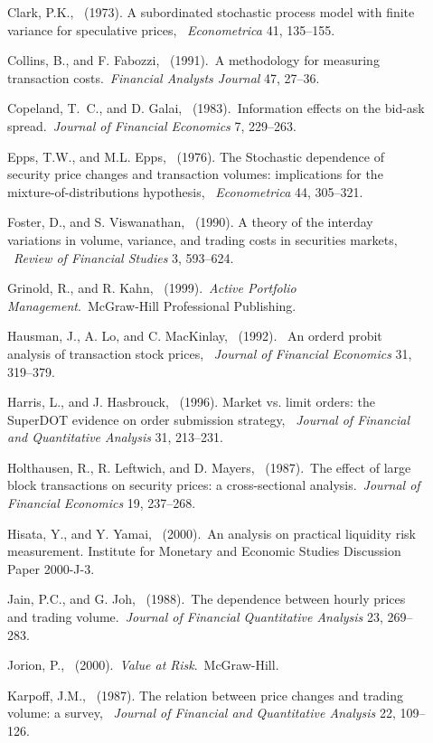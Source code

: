 \begin{description}
 \item[] Clark, P.K., ~(1973). A subordinated stochastic process model with finite variance for speculative prices, ~{\it Econometrica} 41, 135--155.
 \item[] Collins, B., and F. Fabozzi, ~(1991).~A methodology for measuring transaction costs.~{\it Financial Analysts Journal} 47, 27--36.
 \item[] Copeland, T.~C., and D. Galai, ~(1983).~Information effects on the bid-ask spread.~{\it Journal of Financial Economics} 7, 229--263.
 \item[] Epps, T.W., and M.L. Epps, ~(1976). The Stochastic dependence of security price changes and transaction volumes: implications for the mixture-of-distributions hypothesis, ~{\it Econometrica} 44, 305--321.
 \item[] Foster, D., and S. Viswanathan, ~(1990). A theory of the interday variations in volume, variance, and trading costs in securities markets, ~{\it Review of Financial Studies} 3, 593--624.
 \item[] Grinold, R., and R. Kahn, ~(1999).~{\it Active Portfolio Management}.~McGraw-Hill Professional Publishing.
 \item[] Hausman, J., A. Lo, and C. MacKinlay, ~(1992). ~An orderd probit analysis of transaction stock prices, ~{\it Journal of Financial Economics} 31, 319--379.
 \item[] Harris, L., and J. Hasbrouck, ~(1996). Market vs. limit orders: the SuperDOT evidence on order submission strategy, ~{\it Journal of Financial and Quantitative Analysis} 31, 213--231.
 \item[] Holthausen, R., R. Leftwich, and D. Mayers, ~(1987).~The effect of large block transactions on security prices: a cross-sectional analysis.~{\it Journal of Financial Economics} 19, 237--268.
 \item[] Hisata, Y., and Y. Yamai, ~(2000).~An analysis on practical liquidity risk measurement.  Institute for Monetary and Economic Studies Discussion Paper 2000-J-3.
 \item[] Jain, P.C., and G. Joh,  ~(1988).~The dependence between hourly
	    prices and trading volume.~{\it Journal of Financial Quantitative Analysis} 23, 269--283.
 \item[] Jorion, P., ~(2000).~{\it Value at Risk}.~McGraw-Hill.
 \item[] Karpoff, J.M., ~(1987). The relation between price changes and trading volume: a survey, ~{\it Journal of Financial and Quantitative Analysis} 22, 109--126.

\end{description}
